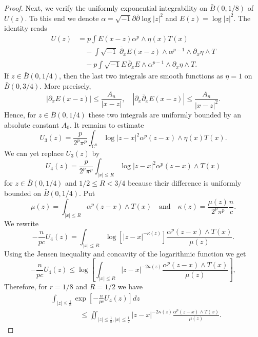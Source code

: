 \documentclass{amsart}
\renewcommand{\d}{\partial}
\newcommand{\ddbar}{\sqrt{-1}\d\overline{\d}}
\newcommand{\dbar}{\overline{\d}}
\newcommand{\ii}{\sqrt{-1}}
\newcommand{\al}{\alpha}
\newcommand{\ka}{\kappa}
\newcommand{\bC}{\mathbb{C}}
\theoremstyle{definition}
\numberwithin{thm}{section}
\numberwithin{equation}{section}
\renewcommand{\[}{\begin{equation}}
\renewcommand{\]}{\end{equation}}
\newcommand{\wed}{\wedge}
\begin{document}
\begin{proof}
Next, we  verify the uniformly exponential integrability on $\bar B(0,1/8)$ of $U(z)$. To this end we 
denote $\al = \ddbar \log |z|^2$ and $E (z) = \log|z|^2$.  The identity \cite[Eq. (7.13)]{Sk72} reads
$$\begin{aligned}
	U(z) 
&= p  \int E(x-z) \al^p \wed \eta (x) T(x) \\
&\quad - \int \ii\; \dbar_x E(x-z) \wed \al^{p-1} \wed \d_x \eta \wed T \\
&\quad - p  \int \ii E\, \dbar_x E \wed \al^{p-1} \wed \d_x \eta \wed T.
\end{aligned}$$
If $z \in \bar B(0,1/4)$, then the last two integrals are smooth functions as $\eta =1$ on $\bar B(0,3/4)$. More precisely, 
$$
	|\d_x E(x-z)| \leq \frac{A_n}{|x-z|}, \quad  |\d_x\bar\d_x E(x-z)| \leq \frac{A_n}{|x-z|^2}.
$$
Hence, for $z\in \bar B(0,1/4)$ these two integrals are uniformly bounded by an absolute constant $A_0$. It remains to estimate 
$$
	U_3(z) = \frac{p }{2^p \pi^p}\int_{\bC^n} \log|z-x|^2 \al^p(z-x) \wed \eta(x) T(x).
$$
We can yet replace $U_3(z)$ by 
$$
	U_4(z) =\frac{p }{2^p \pi^p} \int_{|x|\leq R} \log |z-x|^2 \al^p(z-x) \wed T(x)
$$
for $z\in \bar B(0,1/4)$ and $1/2 \leq R < 3/4$
because their difference is uniformly bounded on $\bar B(0,1/4)$. 
Put 
\[
	\mu(z) = \int_{|x| \leq R} \al^p(z-x) \wed T(x) \quad\text{and}\quad
	\ka(z) = \frac{\mu(z)}{2^p \pi^p} \frac{n}{c}.
\]
We rewrite
$$
	- \frac{n}{pc} U_4 (z) = \int_{|x|\leq R} \log [ |z-x|^{- \ka(z)}] \frac{\al^p(z-x) \wed T(x)}{ \mu(z)}.
$$
Using the Jensen inequality and concavity of the logarithmic function we get
\[
	- \frac{n}{pc} U_4(z) \leq \log \left[  \int_{|x| \leq R} |z-x|^{-2 \ka(z)} \frac{\al^p(z-x) \wed T(x)}{\mu(z)}  \right] , 
\]
Therefore, for $r = 1/8$ and  $R=1/2$ we have
\[ \label{eq:exp-U4} \begin{aligned}
 &\int_{|z| \leq \frac{1}{8}} \exp \left[ - \frac{n}{pc} U_4(z) \right] dz \\
&\qquad\qquad \leq \iint_{|z| \leq \frac{1}{8}, |x| \leq \frac{1}{2}} |z-x|^{-2\ka(z)} \frac{\al^p(z-x) \wed T(x)}{\mu(z)}.
\end{aligned}\]


\end{proof}
\end{document}
